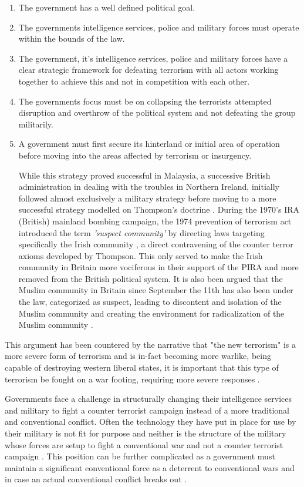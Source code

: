 \begin{enumerate}
\item The government has a well defined political goal.
\item The governments intelligence services, police and military forces must operate within the bounds of the law.
\item The government, it's intelligence services, police and military forces have a clear strategic framework for defeating terrorism with all actors working together to achieve this and not in competition with each other.
\item The governments focus must be on collapsing the terrorists attempted disruption and overthrow of the political system and not defeating the group militarily.
\item A government must first secure its hinterland or initial area of operation before moving into the areas affected by terrorism or insurgency.

While this strategy proved successful in Malaysia, a successive British administration in dealing with the troubles in Northern Ireland, initially followed almost exclusively a military strategy before moving to a more successful strategy modelled on Thompson's doctrine \citep{lafree2009impact}. During the 1970's IRA (British) mainland bombing campaign, the 1974 prevention of terrorism act introduced the term \textit{'suspect community'} by directing  laws targeting specifically the Irish community \citep{hillyard1993suspect}, a direct contravening of the counter terror axioms developed by Thompson. This only served to make the Irish community in Britain more vociferous in their support of the PIRA and more removed from the British political system. It is also been argued that the Muslim community in Britain since September the 11th has also been under the law, categorized as suspect, leading to discontent and isolation of the Muslim community and creating the environment for radicalization of the Muslim community \citep{pantazis2009old}.
\end{enumerate}
This argument has been countered by the narrative that "the new terrorism" is a more severe form of terrorism and is in-fact becoming more warlike, being capable of destroying western liberal states, it is important that this type of terrorism be fought on a war footing, requiring more severe responses \citep{bobbitt2008terror}.

Governments face a challenge in structurally changing their intelligence services and military to fight a counter terrorist campaign instead of a more traditional and conventional conflict. Often the technology they have put in place for use by their military is not fit for purpose and neither is the structure of the military whose forces are setup to fight a conventional war and not a counter terrorist campaign \citep{gazette1989changing}. This position can be further complicated as a government must maintain a significant conventional force as a deterrent to conventional wars and in case an actual conventional conflict breaks out \citep{gates2009balanced}.

